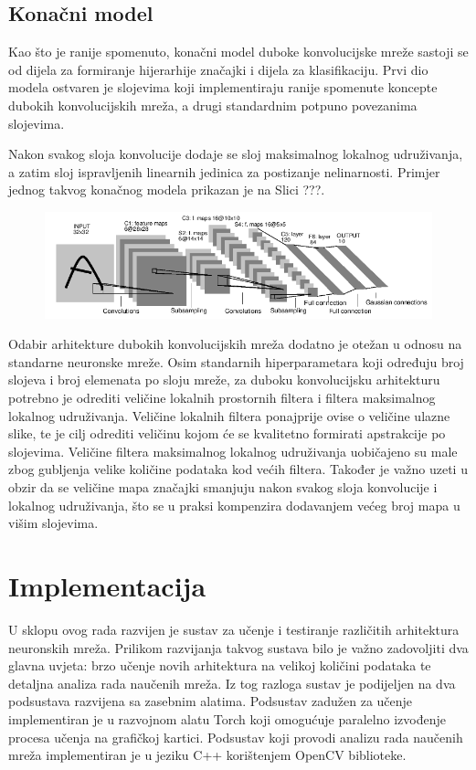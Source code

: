 \documentclass[lmodern, utf8, diplomski, numeric]{fer}
\begin{document}
\section{Konačni model}

Kao što je ranije spomenuto, konačni model duboke konvolucijske mreže sastoji se od dijela za formiranje hijerarhije značajki i dijela za klasifikaciju. Prvi dio modela ostvaren je slojevima koji implementiraju ranije spomenute koncepte dubokih konvolucijskih mreža, a drugi standardnim potpuno povezanima slojevima. 

Nakon svakog sloja konvolucije dodaje se sloj maksimalnog lokalnog udruživanja, a zatim sloj ispravljenih linearnih jedinica za postizanje nelinarnosti. Primjer jednog takvog konačnog modela prikazan je na Slici ???.

\begin{figure}[ht!]
\centering
\includegraphics[width=15cm]{slike/convnet2.png}
\caption{}
\end{figure}

Odabir arhitekture dubokih konvolucijskih mreža dodatno je otežan u odnosu na standarne neuronske mreže. Osim standarnih hiperparametara koji određuju broj slojeva i broj elemenata po sloju mreže, za duboku konvolucijsku arhitekturu potrebno je odrediti veličine lokalnih prostornih filtera i filtera maksimalnog lokalnog udruživanja. Veličine lokalnih filtera ponajprije ovise o veličine ulazne slike, te je cilj odrediti veličinu kojom će se kvalitetno formirati apstrakcije po slojevima. Veličine filtera maksimalnog lokalnog udruživanja uobičajeno su male zbog gubljenja velike količine podataka kod većih filtera. Također je važno uzeti u obzir da se veličine mapa značajki smanjuju nakon svakog sloja konvolucije i lokalnog udruživanja, što se u praksi kompenzira dodavanjem većeg broj mapa u višim slojevima.



\chapter{Implementacija}

U sklopu ovog rada razvijen je sustav za učenje i testiranje različitih arhitektura neuronskih mreža. Prilikom razvijanja takvog sustava bilo je važno zadovoljiti dva glavna uvjeta: brzo učenje novih arhitektura na velikoj količini podataka te detaljna analiza rada naučenih mreža. Iz tog razloga sustav je podijeljen na dva podsustava razvijena sa zasebnim alatima. Podsustav zadužen za učenje implementiran je u razvojnom alatu Torch koji omogućuje paralelno izvođenje procesa učenja na grafičkoj kartici. Podsustav koji provodi analizu rada naučenih mreža implementiran je u jeziku C++ korištenjem OpenCV biblioteke.
\end{document}
